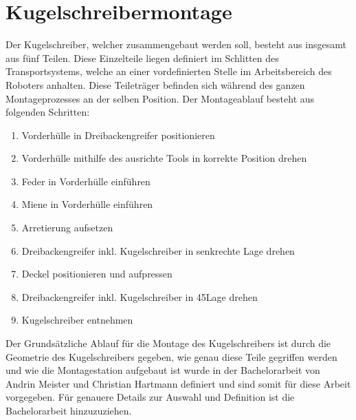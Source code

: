 \section{Kugelschreibermontage}
Der Kugelschreiber, welcher zusammengebaut werden soll, besteht aus insgesamt aus fünf Teilen. Diese Einzelteile liegen definiert im Schlitten des Transportsystems, welche an einer vordefinierten Stelle im Arbeitsbereich des Roboters anhalten. Diese Teileträger befinden sich während des ganzen Montageprozesses an der selben Position.
Der Montageablauf besteht aus folgenden Schritten:
\begin{enumerate}
	\item Vorderhülle in Dreibackengreifer positionieren
	\item Vorderhülle mithilfe des ausrichte Tools in korrekte Position drehen
	\item Feder in Vorderhülle einführen
	\item Miene in Vorderhülle einführen
	\item Arretierung aufsetzen
	\item Dreibackengreifer inkl. Kugelschreiber in senkrechte Lage drehen
	\item Deckel positionieren und aufpressen
	\item Dreibackengreifer inkl. Kugelschreiber in 45\textdegree Lage drehen
	\item Kugelschreiber entnehmen
\end{enumerate}
Der Grundsätzliche Ablauf für die Montage des Kugelschreibers ist durch die Geometrie des Kugelschreibers gegeben, wie genau diese Teile gegriffen werden und wie die Montagestation aufgebaut ist wurde in der Bachelorarbeit von Andrin Meister und Christian Hartmann definiert und sind somit für diese Arbeit vorgegeben. Für genauere Details zur Auswahl und Definition ist die Bachelorarbeit hinzuzuziehen.